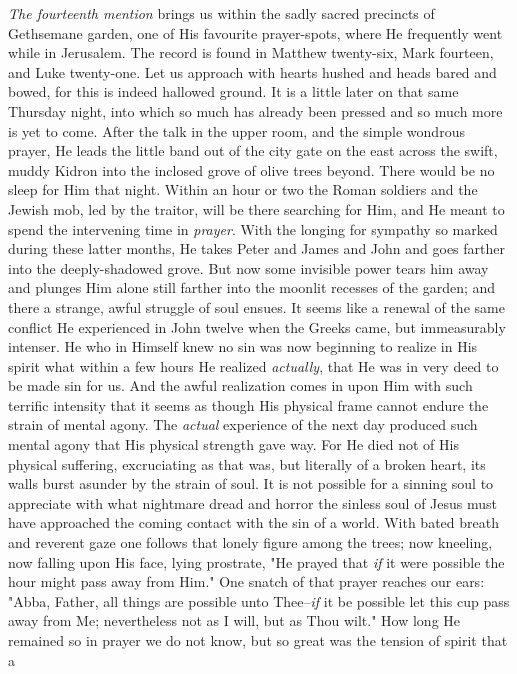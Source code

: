 \textit{The fourteenth mention} brings us within the sadly sacred precincts of
Gethsemane garden, one of His favourite prayer-spots, where He frequently
went while in Jerusalem. The record is found in Matthew twenty-six, Mark
fourteen, and Luke twenty-one. Let us approach with hearts hushed and
heads bared and bowed, for this is indeed hallowed ground. It is a little
later on that same Thursday night, into which so much has already been
pressed and so much more is yet to come. After the talk in the upper room,
and the simple wondrous prayer, He leads the little band out of the city
gate on the east across the swift, muddy Kidron into the inclosed grove of
olive trees beyond. There would be no sleep for Him that night. Within an
hour or two the Roman soldiers and the Jewish mob, led by the traitor,
will be there searching for Him, and He meant to spend the intervening
time in \textit{prayer}. With the longing for sympathy so marked during these
latter months, He takes Peter and James and John and goes farther into the
deeply-shadowed grove. But now some invisible power tears him away and
plunges Him alone still farther into the moonlit recesses of the garden;
and there a strange, awful struggle of soul ensues. It seems like a
renewal of the same conflict He experienced in John twelve when the Greeks
came, but immeasurably intenser. He who in Himself knew no sin was now
beginning to realize in His spirit what within a few hours He realized
\textit{actually}, that He was in very deed to be made sin for us. And the awful
realization comes in upon Him with such terrific intensity that it seems
as though His physical frame cannot endure the strain of mental agony. The
\textit{actual} experience of the next day produced such mental agony that His
physical strength gave way. For He died not of His physical suffering,
excruciating as that was, but literally of a broken heart, its walls burst
asunder by the strain of soul. It is not possible for a sinning soul to
appreciate with what nightmare dread and horror the sinless soul of Jesus
must have approached the coming contact with the sin of a world. With
bated breath and reverent gaze one follows that lonely figure among the
trees; now kneeling, now falling upon His face, lying prostrate, "He
prayed that \textit{if} it were possible the hour might pass away from Him." One
snatch of that prayer reaches our ears: "Abba, Father, all things are
possible unto Thee--\textit{if} it be possible let this cup pass away from Me;
nevertheless not as I will, but as Thou wilt." How long He remained so in
prayer we do not know, but so great was the tension of spirit that a
